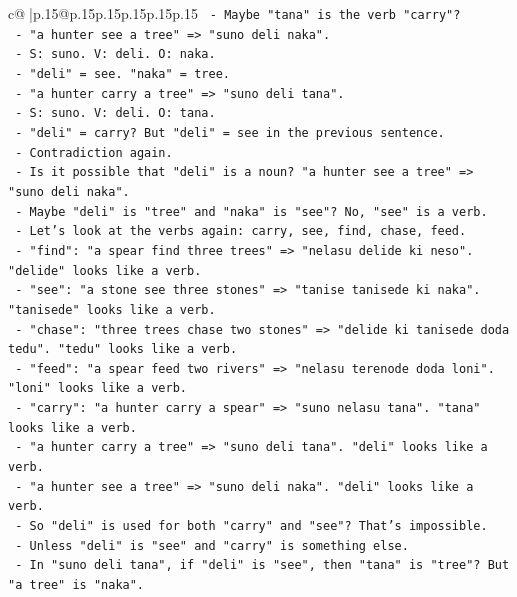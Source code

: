 \documentclass{article}
\begin{document}
{\begin{supertabular}{c@{$\;$}|p{.15\linewidth}@{}p{.15\linewidth}p{.15\linewidth}p{.15\linewidth}p{.15\linewidth}p{.15\linewidth}}
{{{\texttt{         {-} Maybe "tana" is the verb "carry"?} \\
\texttt{       {-} "a hunter see a tree" => "suno deli naka".} \\
\texttt{         {-} S: suno. V: deli. O: naka.} \\
\texttt{         {-} "deli" = see. "naka" = tree.} \\
\texttt{       {-} "a hunter carry a tree" => "suno deli tana".} \\
\texttt{         {-} S: suno. V: deli. O: tana.} \\
\texttt{         {-} "deli" = carry? But "deli" = see in the previous sentence.} \\
\texttt{         {-} Contradiction again.} \\
\texttt{     {-} Is it possible that "deli" is a noun? "a hunter see a tree" => "suno deli naka".} \\
\texttt{       {-} Maybe "deli" is "tree" and "naka" is "see"? No, "see" is a verb.} \\
\texttt{     {-} Let's look at the verbs again: carry, see, find, chase, feed.} \\
\texttt{       {-} "find": "a spear find three trees" => "nelasu delide ki neso". "delide" looks like a verb.} \\
\texttt{       {-} "see": "a stone see three stones" => "tanise tanisede ki naka". "tanisede" looks like a verb.} \\
\texttt{       {-} "chase": "three trees chase two stones" => "delide ki tanisede doda tedu". "tedu" looks like a verb.} \\
\texttt{       {-} "feed": "a spear feed two rivers" => "nelasu terenode doda loni". "loni" looks like a verb.} \\
\texttt{       {-} "carry": "a hunter carry a spear" => "suno nelasu tana". "tana" looks like a verb.} \\
\texttt{       {-} "a hunter carry a tree" => "suno deli tana". "deli" looks like a verb.} \\
\texttt{       {-} "a hunter see a tree" => "suno deli naka". "deli" looks like a verb.} \\
\texttt{       {-} So "deli" is used for both "carry" and "see"? That's impossible.} \\
\texttt{       {-} Unless "deli" is "see" and "carry" is something else.} \\
\texttt{       {-} In "suno deli tana", if "deli" is "see", then "tana" is "tree"? But "a tree" is "naka".} \\
}}}
\end{supertabular}}
\end{document}
